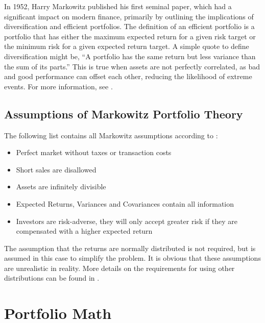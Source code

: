 \documentclass[
  oneside]{book}
\providecommand{\tightlist}{%
  \setlength{\itemsep}{0pt}\setlength{\parskip}{0pt}}
\begin{document}
In 1952, Harry Markowitz published his first seminal paper, which had a significant impact on modern finance, primarily by outlining the implications of diversification and efficient portfolios. The definition of an efficient portfolio is a portfolio that has either the maximum expected return for a given risk target or the minimum risk for a given expected return target. A simple quote to define diversification might be, ``A portfolio has the same return but less variance than the sum of its parts.'' This is true when assets are not perfectly correlated, as bad and good performance can offset each other, reducing the likelihood of extreme events. For more information, see \citep{Mari2005}.

\hypertarget{assumptions-of-markowitz-portfolio-theory}{%
\subsection{Assumptions of Markowitz Portfolio Theory}\label{assumptions-of-markowitz-portfolio-theory}}

The following list contains all Markowitz assumptions according to \citep{Mari2005}:

\begin{itemize}
\tightlist
\item
  Perfect market without taxes or transaction costs
\item
  Short sales are disallowed
\item
  Assets are infinitely divisible
\item
  Expected Returns, Variances and Covariances contain all information
\item
  Investors are risk-adverse, they will only accept greater risk if they
  are compensated with a higher expected return
\end{itemize}

The assumption that the returns are normally distributed is not required, but is assumed in this case to simplify the problem. It is obvious that these assumptions are unrealistic in reality. More details on the requirements for using other distributions can be found in \citep{Mari2005}.

\hypertarget{portfolio-math}{%
\section{Portfolio Math}\label{portfolio-math}}
\end{document}
